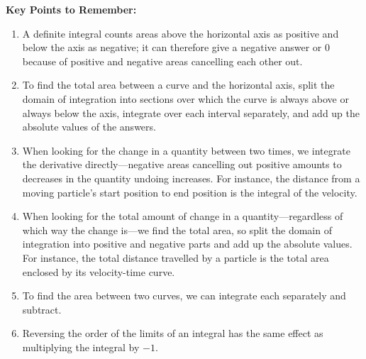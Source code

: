 \documentclass{article}
\begin{document}
\clearpage













{\bf Key Points to Remember:}

\vspace{5mm}

\begin{enumerate}
	\item A definite integral counts areas above the horizontal axis as positive and below the axis as negative; it can therefore give a negative answer or 0 because of positive and negative areas cancelling each other out.
	\item To find the total area between a curve and the horizontal axis, split the domain of integration into sections over which the curve is always above or always below the axis, integrate over each interval separately, and add up the absolute values of the answers.
	\item When looking for the change in a quantity between two times, we integrate the derivative directly---negative areas cancelling out positive amounts to decreases in the quantity undoing increases. For instance, the distance from a moving particle's start position to end position is the integral of the velocity.
	\item When looking for the total amount of change in a quantity---regardless of which way the change is---we find the total area, so split the domain of integration into positive and negative parts and add up the absolute values. For instance, the total distance travelled by a particle is the total area enclosed by its velocity-time curve.
	\item To find the area between two curves, we can integrate each separately and subtract.
	\item Reversing the order of the limits of an integral has the same effect as multiplying the integral by $-1$.
\end{enumerate}
\end{document}
